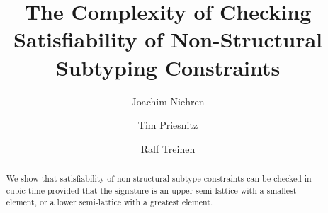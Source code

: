 \documentclass[11pt]{article}
\title{The Complexity of Checking Satisfiability of Non-Structural
  Subtyping Constraints}
\author{Joachim Niehren \and Tim Priesnitz \and Ralf Treinen}
\begin{document}
\maketitle

\begin{abstract}
  We show that satisfiability of non-structural subtype constraints
  can be checked in cubic time provided that the signature is an upper
  semi-lattice with a smallest element, or a lower semi-lattice with a
  greatest element.
\end{abstract}









\end{document}
